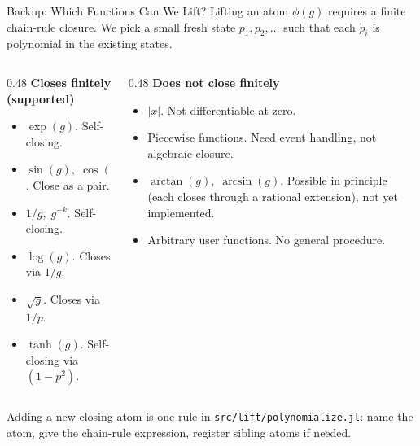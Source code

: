 \documentclass[aspectratio=169,10pt]{beamer}
\begin{document}
\begin{frame}{Backup: Which Functions Can We Lift?}
  Lifting an atom $\phi(g)$ requires a finite chain-rule closure. We pick a small fresh state $p_1, p_2, \ldots$ such that each $\dot{p}_i$ is polynomial in the existing states.

  \medskip
  \begin{columns}[T]
    \begin{column}{0.48\textwidth}
      \textbf{Closes finitely (supported)}
      \begin{itemize}\setlength\itemsep{0pt}
        \item $\exp(g)$. Self-closing.
        \item $\sin(g),\;\cos(g)$. Close as a pair.
        \item $1/g,\;g^{-k}$. Self-closing.
        \item $\log(g)$. Closes via $1/g$.
        \item $\sqrt{g}$. Closes via $1/p$.
        \item $\tanh(g)$. Self-closing via $(1 - p^2)$.
      \end{itemize}
    \end{column}
    \begin{column}{0.48\textwidth}
      \textbf{Does not close finitely}
      \begin{itemize}\setlength\itemsep{0pt}
        \item $|x|$. Not differentiable at zero.
        \item Piecewise functions. Need event handling, not algebraic closure.
        \item $\arctan(g),\;\arcsin(g)$. Possible in principle (each closes through a rational extension), not yet implemented.
        \item Arbitrary user functions. No general procedure.
      \end{itemize}
    \end{column}
  \end{columns}

  \medskip
  Adding a new closing atom is one rule in \texttt{src/lift/polynomialize.jl}: name the atom, give the chain-rule expression, register sibling atoms if needed.
\end{frame}
\end{document}
